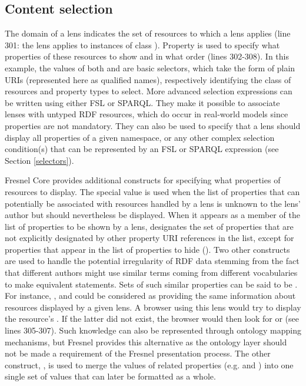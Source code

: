 \subsection{Content selection}

The domain of a lens indicates the set of resources to which a lens applies (line 301: the lens applies to instances of class ). Property  is used to specify what properties of these resources to show and in what order (lines 302-308). In this example, the values of both  and  are basic selectors, which take the form of plain URIs (represented here as qualified names), respectively identifying the class of resources and property types to select. More advanced selection expressions can be written using either FSL or SPARQL. They make it possible to associate lenses with untyped RDF resources, which do occur in real-world models since  properties are not mandatory. They can also be used to specify that a lens should display all properties of a given namespace, or any other complex selection condition(s) that can be represented by an FSL or SPARQL expression (see Section \ref{selectors}).

Fresnel Core provides additional constructs for specifying what properties of resources to display. The special value  is used when the list of properties that can potentially be associated with resources handled by a lens is unknown to the lens' author but should nevertheless be displayed. When it appears as a member of the list of properties to be shown by a lens,  designates the set of properties that are not explicitly designated by other property URI references in the list, except for properties that appear in the list of properties to hide (). Two other constructs are used to handle the potential irregularity of RDF data stemming from the fact that different authors might use similar terms coming from different vocabularies to make equivalent statements. Sets of such similar properties can be said to be . For instance, ,  and  could be considered as providing the same information about resources displayed by a given lens. A browser using this lens would try to display the resource's . If the latter did not exist, the browser would then look for  or  (see lines 305-307). Such knowledge can also be represented through ontology mapping mechanisms, but Fresnel provides this alternative as the ontology layer should not be made a requirement of the Fresnel presentation process. The other construct, , is used to merge the values of related properties (e.g.  and ) into one single set of values that can later be formatted as a whole. 

